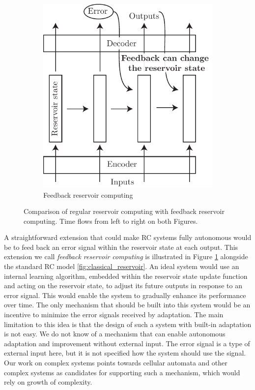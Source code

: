 \begin{figure}[htbp]
\begin{subfigure}[t]{.45\linewidth}
    \includegraphics[width=\linewidth]{figures/feedback_reservoir.pdf}
    \caption{Feedback reservoir computing}
    \label{fig:feedback_reservoir}
  \end{subfigure}
  \caption{Comparison of regular reservoir computing with feedback reservoir
    computing. Time flows from left to right on both Figures.}
  \label{fig:reservoir_comp}
\end{figure}

A straightforward extension that could make \ac{RC} systems fully autonomous
would be to feed back an error signal within the reservoir state at each
output. This extension we call \emph{feedback reservoir computing} is
illustrated in Figure \ref{fig:feedback_reservoir} alongside the standard
\ac{RC} model \ref{fig:classical_reservoir}. 
An ideal system would use an internal learning algorithm, embedded within 
the reservoir state update function and acting on the reservoir state, to 
adjust its future outputs in response to an error signal. This would enable 
the system to gradually enhance its performance over time.
The only mechanism that should be built into
this system would be an incentive to minimize the error signals received by
adaptation. The main limitation to this idea is that the design of such a system with
built-in adaptation is not easy. We do not know of a mechanism that can enable
autonomous adaptation and improvement without external input. The error signal is a 
type of external input here, but it is not specified how the system should use the 
signal. Our work on
complex systems points towards cellular automata and other complex systems as
candidates for supporting such a mechanism, which would rely on growth of
complexity.

